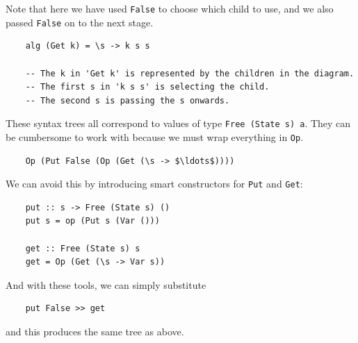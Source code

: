 \documentclass[a4paper,12pt]{article}
\theoremstyle{remark}
\begin{document}
Note that here we have used \lstinline{False} to choose which child to use, and
we also passed \lstinline{False} on to the next stage.

\begin{lstlisting}
    alg (Get k) = \s -> k s s

    -- The k in 'Get k' is represented by the children in the diagram.
    -- The first s in 'k s s' is selecting the child.
    -- The second s is passing the s onwards.  \end{lstlisting}

These syntax trees all correspond to values of type \lstinline{Free (State s) a}.
They can be cumbersome to work with because we must wrap everything in \lstinline{Op}.

\begin{lstlisting}
    Op (Put False (Op (Get (\s -> $\ldots$))))  \end{lstlisting}

We can avoid this by introducing smart constructors for \lstinline{Put} and
\lstinline{Get}:

\begin{lstlisting}
    put :: s -> Free (State s) ()
    put s = op (Put s (Var ()))

    get :: Free (State s) s
    get = Op (Get (\s -> Var s))  \end{lstlisting}

And with these tools, we can simply substitute

\begin{lstlisting}
    put False >> get  \end{lstlisting}

and this produces the same tree as above.
\end{document}
